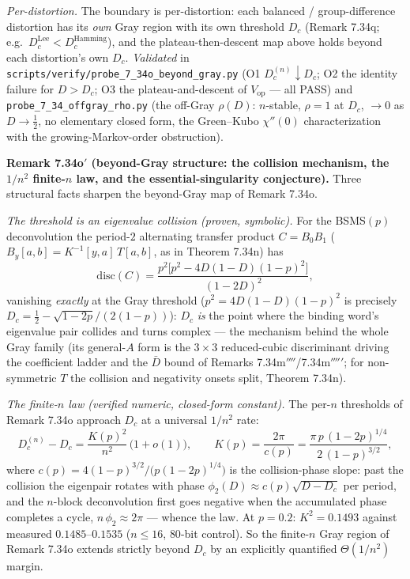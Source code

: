 \documentclass[
]{article}
\begin{document}
\emph{Per-distortion.} The boundary is per-distortion: each balanced /
group-difference distortion has its \emph{own} Gray region with its own
threshold $D_c$ (Remark 7.34q; e.g.\ $D_c^{\mathrm{Lee}}<D_c^{\mathrm{Hamming}}$),
and the plateau-then-descent map above holds beyond each distortion's own $D_c$.
\emph{Validated} in
\texttt{scripts/verify/probe\_7\_34o\_beyond\_gray.py} (O1 $D_c^{(n)}\!\downarrow
D_c$; O2 the identity failure for $D>D_c$; O3 the plateau-and-descent of
$V_{\mathrm{op}}$ --- all PASS) and \texttt{probe\_7\_34\_offgray\_rho.py} (the
off-Gray $\rho(D)$: $n$-stable, $\rho=1$ at $D_c$, $\to0$ as $D\to\tfrac12$, no
elementary closed form, the Green--Kubo $\chi''(0)$ characterization with the
growing-Markov-order obstruction).

\textbf{Remark 7.34o$'$ (beyond-Gray structure: the collision mechanism, the
$1/n^2$ finite-$n$ law, and the essential-singularity conjecture).} Three
structural facts sharpen the beyond-Gray map of Remark 7.34o.

\emph{The threshold is an eigenvalue collision (proven, symbolic).} For the
BSMS$(p)$ deconvolution the period-$2$ alternating transfer product $C=B_0B_1$
($B_y[a,b]=K^{-1}[y,a]\,T[a,b]$, as in Theorem 7.34n) has
\[
  \mathrm{disc}(C)=\frac{p^2\bigl[p^2-4D(1-D)(1-p)^2\bigr]}{(1-2D)^2},
\]
vanishing \emph{exactly} at the Gray threshold ($p^2=4D(1-D)(1-p)^2$ is
precisely $D_c=\tfrac12-\sqrt{1-2p}/(2(1-p))$): $D_c$ \emph{is} the point
where the binding word's eigenvalue pair collides and turns complex --- the
mechanism behind the whole Gray family (its general-$A$ form is the $3\times3$
reduced-cubic discriminant driving the coefficient ladder and the $\bar D$
bound of Remarks 7.34m$''''$/7.34m$'''''$; for non-symmetric $T$ the collision
and negativity onsets split, Theorem 7.34n).

\emph{The finite-$n$ law (verified numeric, closed-form constant).} The
per-$n$ thresholds of Remark 7.34o approach $D_c$ at a universal $1/n^2$ rate:
\[
  D_c^{(n)}-D_c=\frac{K(p)^2}{n^2}\,\bigl(1+o(1)\bigr),\qquad
  K(p)=\frac{2\pi}{c(p)}=\frac{\pi\,p\,(1-2p)^{1/4}}{2\,(1-p)^{3/2}},
\]
where $c(p)=4(1-p)^{3/2}/\bigl(p(1-2p)^{1/4}\bigr)$ is the collision-phase
slope: past the collision the eigenpair rotates with phase
$\phi_2(D)\approx c(p)\sqrt{D-D_c}$ per period, and the $n$-block
deconvolution first goes negative when the accumulated phase completes a
cycle, $n\,\phi_2\approx2\pi$ --- whence the law. At $p=0.2$: $K^2=0.1493$
against measured $0.1485$--$0.1535$ ($n\le16$, $80$-bit control). So the
finite-$n$ Gray region of Remark 7.34o extends strictly beyond $D_c$ by an
explicitly quantified $\Theta(1/n^2)$ margin.
\end{document}

